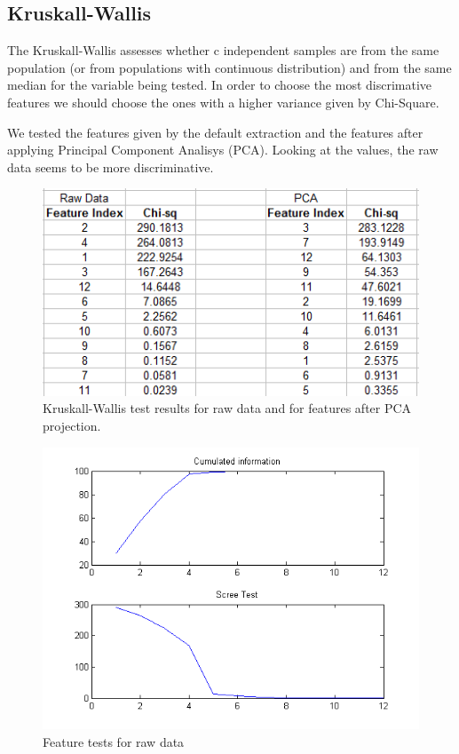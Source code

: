 \documentclass[english, a4paper, 12pt]{article}
\newcommand{\tab}{\hspace*{2em}}
\begin{document}
\subsection{Kruskall-Wallis}
\tab The Kruskall-Wallis assesses whether c independent samples are from the same population (or from populations with continuous distribution) and from the same median for the variable being tested.
In order to choose the most discrimative features we should choose the ones with a higher variance given by Chi-Square.

\tab We tested the features given by the default extraction and the features after applying Principal Component Analisys (PCA).
Looking at the values, the raw data seems to be more  discriminative.\bigskip\\

\begin{figure}[H]
  \centering
  \includegraphics[scale= .8]{kruskallwallis.png}
  \caption {Kruskall-Wallis test results for raw data and for features after PCA 	projection.}
\end{figure}
\bigskip
\begin{figure}[H]
  \centering
  \includegraphics[scale= .8]{no_pca_features_information.png}
  \caption {Feature tests for raw data}
\end{figure}
\end{document}
